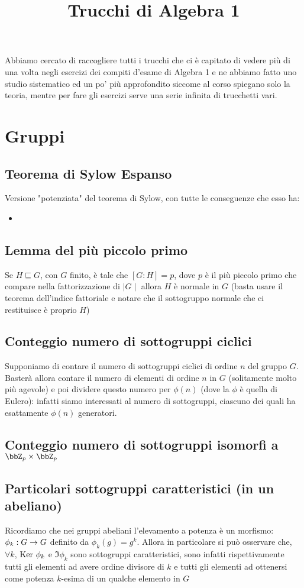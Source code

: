 \documentclass[a4paper,NoNotes,GeneralMath]{stdmdoc}
\newcommand{\sgr}{\sqsubseteq}
\begin{document}
	\title{Trucchi di Algebra 1}
	\autodate
	Abbiamo cercato di raccogliere tutti i trucchi che ci è capitato di vedere più di una volta negli esercizi dei compiti d'esame di Algebra 1 e ne abbiamo fatto uno studio sistematico ed un po' più approfondito siccome al corso spiegano solo la teoria, mentre per fare gli esercizi serve una serie infinita di trucchetti vari.
	
	\section{Gruppi}
	\subsection{Teorema di Sylow Espanso}
	Versione "potenziata" del teorema di Sylow, con tutte le conseguenze che esso ha:
	\begin{itemize}
		\item
	\end{itemize}
	
	\subsection{Lemma del più piccolo primo}
	Se $H \sgr G$, con $G$ finito, è tale che $[G:H] = p$, dove $p$ è il più piccolo primo che compare nella fattorizzazione di $\mid G \mid$ allora $H$ è normale in $G$ (basta usare il teorema dell'indice fattoriale e notare che il sottogruppo normale che ci restituisce è proprio $H$)
	
	\subsection{Conteggio numero di sottogruppi ciclici}
	Supponiamo di contare il numero di sottogruppi ciclici di ordine $n$ del gruppo $G$. Basterà allora contare il numero di elementi di ordine $n$ in $G$ (solitamente molto più agevole) e poi dividere questo numero per $\phi(n)$ (dove la $\phi$ è quella di Eulero): infatti siamo interessati al numero di sottogruppi, ciascuno dei quali ha esattamente $\phi(n)$ generatori.
	
	\subsection{Conteggio numero di sottogruppi isomorfi a $\bbZ_p \times \bbZ_p$}
	
	
	\subsection{Particolari sottogruppi caratteristici (in un abeliano)} 
	Ricordiamo che nei gruppi abeliani l'elevamento a potenza è un morfismo: $\phi_k: G \rightarrow G$ definito da $\phi_k(g) = g^k$. Allora in particolare si può osservare che, $\forall k$, $\mbox{Ker } \phi_k$ e $\Im \phi_k$ sono sottogruppi caratteristici, sono infatti rispettivamente tutti gli elementi ad avere ordine divisore di $k$ e tutti gli elementi ad ottenersi come potenza $k$-esima di un qualche elemento in $G$	
	
\end{document}

